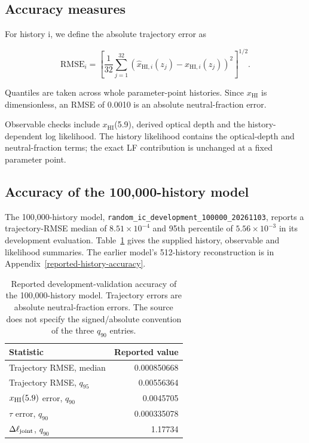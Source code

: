 \subsection{Accuracy measures}\label{accuracy-measures}

For history i, we define the absolute trajectory error as

\[
\mathrm{RMSE}_i=\left[\frac{1}{32}\sum_{j=1}^{32}
\left(\widehat{x}_{\mathrm{HI},i}(z_j)-x_{\mathrm{HI},i}(z_j)\right)^2\right]^{1/2}.
\]

Quantiles are taken across whole parameter-point histories. Since \ensuremath{x_{\mathrm{HI}}} is dimensionless, an RMSE of 0.0010 is an absolute neutral-fraction error.

Observable checks include \ensuremath{x_{\mathrm{HI}}}(5.9), derived optical depth and the history-dependent log likelihood. The history likelihood contains the optical-depth and neutral-fraction terms; the exact LF contribution is unchanged at a fixed parameter point.

\subsection{Accuracy of the 100,000-history model}\label{new-model-validation}

The 100,000-history model, \texttt{random\_ic\_development\_100000\_20261103}, reports a trajectory-RMSE median of $8.51\times10^{-4}$ and 95th percentile of $5.56\times10^{-3}$ in its development evaluation. Table~\ref{tab:100k-validation} gives the supplied history, observable and likelihood summaries. The earlier model's 512-history reconstruction is in Appendix~\ref{reported-history-accuracy}.

\begin{table}[t]\centering\small
\caption{Reported development-validation accuracy of the 100,000-history model. Trajectory errors are absolute neutral-fraction errors. The source does not specify the signed/absolute convention of the three $q_{90}$ entries.}\label{tab:100k-validation}
\begin{tabular}{lr}\toprule
Statistic & Reported value\\\midrule
Trajectory RMSE, median & 0.000850668\\
Trajectory RMSE, $q_{95}$ & 0.00556364\\
$x_{\rm HI}(5.9)$ error, $q_{90}$ & 0.0045705\\
$\tau$ error, $q_{90}$ & 0.000335078\\
$\Delta\ell_{\rm joint}$, $q_{90}$ & 1.17734\\
\bottomrule\end{tabular}\end{table}

